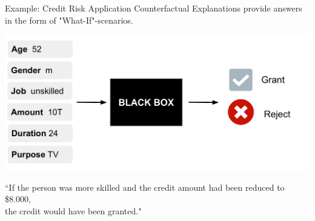 \documentclass[11pt,compress,t,notes=noshow, aspectratio=169, xcolor=table, usenames,dvipsnames]{beamer}
\begin{document}
\begin{frame}{Example: Credit Risk Application}
	Counterfactual Explanations provide answers in the form of "What-If"-scenarios.
	\begin{center}\includegraphics[width=0.6\linewidth, page=2]{figure/counterfactuals_credit.pdf} \end{center}

	``If the person was more skilled and the credit amount had been reduced to \$8.000,\\ the credit would have been granted."  \\[0.2cm]

\end{frame}


\end{document}
